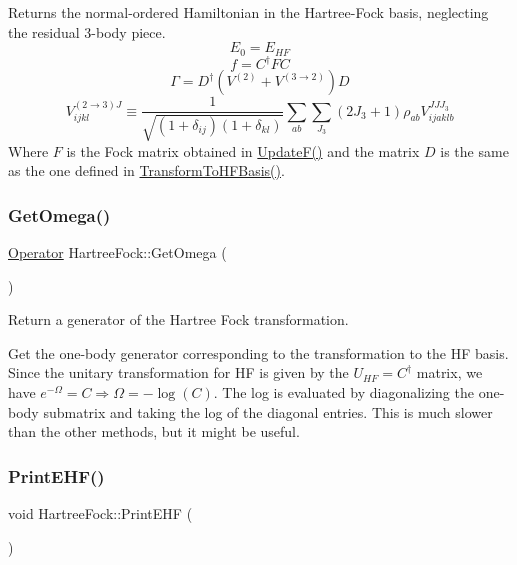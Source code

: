 Returns the normal-\/ordered Hamiltonian in the Hartree-\/\+Fock basis, neglecting the residual 3-\/body piece. \[ E_0 = E_{HF} \] \[ f = C^{\dagger} F C \] \[ \Gamma = D^{\dagger} \left(V^{(2)}+V^{(3\rightarrow 2)} \right) D \] \[ V^{(2\rightarrow 3)J}_{ijkl} \equiv \frac{1}{\sqrt{(1+\delta_{ij})(1+\delta_{kl})}}\sum_{ab}\sum_{J_3}(2J_{3}+1)\rho_{ab}V^{JJJ_{3}}_{ijaklb} \] Where $ F$ is the Fock matrix obtained in \hyperlink{classHartreeFock_a84fe0eb16f6e5835c920bf8fa98c4442}{Update\+F()} and the matrix $ D$ is the same as the one defined in \hyperlink{classHartreeFock_a55914915cea16669e549025c244b62d0}{Transform\+To\+H\+F\+Basis()}. \mbox{\label{classHartreeFock_a53011b381945ed5c61f50b209db5bf64}} 
\subsubsection{\texorpdfstring{Get\+Omega()}{GetOmega()}}
{\footnotesize\ttfamily \hyperlink{classOperator}{Operator} Hartree\+Fock\+::\+Get\+Omega (\begin{DoxyParamCaption}{ }\end{DoxyParamCaption})}



Return a generator of the Hartree Fock transformation. 

Get the one-\/body generator corresponding to the transformation to the HF basis. Since the unitary transformation for HF is given by the $ U_{HF} = C^{\dagger} $ matrix, we have $ e^{-\Omega} = C \Rightarrow \Omega = -\log(C) $. The log is evaluated by diagonalizing the one-\/body submatrix and taking the log of the diagonal entries. This is much slower than the other methods, but it might be useful. \mbox{\label{classHartreeFock_a2c3bdda2ea86f9a3b18d203c9aecc353}} 
\subsubsection{\texorpdfstring{Print\+E\+H\+F()}{PrintEHF()}}
{\footnotesize\ttfamily void Hartree\+Fock\+::\+Print\+E\+HF (\begin{DoxyParamCaption}{ }\end{DoxyParamCaption})}




